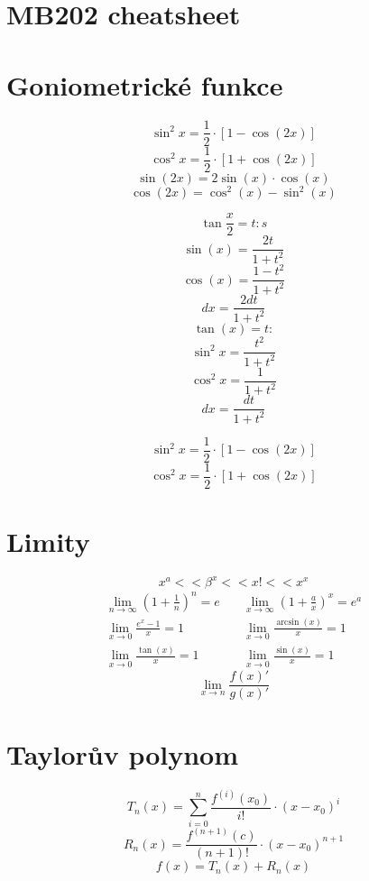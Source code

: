 \documentclass[a4paper]{article}
\begin{document}
\section*{MB202 cheatsheet}

\begin{multicols*}{2}
    \section*{Goniometrické funkce}        
        \[ \sin^2x = \frac{1}{2} \cdot \left[ 1-\cos(2x) \right] \]
        \[ \cos^2x = \frac{1}{2} \cdot \left[ 1+\cos(2x) \right] \]
        \[ \sin(2x) = 2\sin(x) \cdot \cos(x) \]
        \[ \cos(2x) = \cos^2(x) - \sin^2(x) \]
        \begin{multicols*}{2}
            \[ \tan\frac{x}{2} =t: s\]
            \[ \sin(x) = \frac{2t}{1+t^2} \]
            \[ \cos(x) = \frac{1-t^2}{1+t^2} \]
            \[ dx = \frac{2dt}{1+t^2} \]
            \vfill{}
            \columnbreak{}
            \[\tan(x) =t: \]
            \[\sin^2x = \frac{t^2}{1+t^2}\]
            \[\cos^2x = \frac{1}{1+t^2}\]
            \[ dx = \frac{dt}{1+t^2}\]
    \end{multicols*}
    \[\sin^2x = \frac{1}{2} \cdot \left[ 1 - \cos(2x) \right]\]
    \[\cos^2x = \frac{1}{2} \cdot \left[ 1 + \cos(2x) \right]\]
    \section*{Limity}
        \[ {x}^a << {\beta}^x << x! << {x}^x \]
        \begin{align*}
            {\lim_{n \rightarrow \infty} {\left(1 + \frac{1}{n}\right)}^n = e} \quad & {\lim_{x \rightarrow \infty} {\left(1 + \frac{a}{x}\right)}^x = e^a} \\
            {\lim_{x \rightarrow 0} {\frac{e^x - 1}{x}} = 1} \quad & {\lim_{x \rightarrow 0} {\frac{\arcsin(x)}{x} = 1}}\\
            {\lim_{x \rightarrow 0} \frac{\tan(x)}{x} = 1} \quad & {\lim_{x \rightarrow 0} {\frac{\sin(x)}{x} = 1}}
        \end{align*}
            \[  \lim_{x \rightarrow n} \frac{f(x)'}{g(x)'} \]    
    \section*{Taylorův polynom}
        \[ T_n(x) = \sum_{i=0}^{n} \frac{f^{(i)}(x_0)}{i!}\cdot{(x - x_0)}^i \]
        \[ R_n(x) = \frac{f^{(n+1)}(c)}{(n+1)!}\cdot{(x - x_0)}^{n+1} \]
        \[ f(x) = T_n(x) + R_n(x) \]

\end{multicols*}
\end{document}
